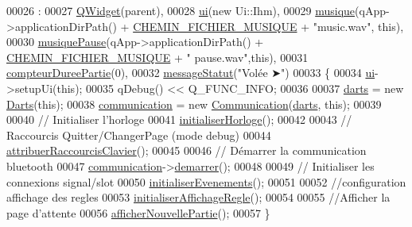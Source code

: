 \begin{DoxyCode}
00026                         :
00027     \hyperlink{class_q_widget}{QWidget}(parent),
00028     \hyperlink{class_ihm_a0ac5f47856566ceeeca1720109bf70ea}{ui}(\textcolor{keyword}{new} Ui::Ihm),
00029     \hyperlink{class_ihm_a6e2a173ec36ee846d6210117b4b85fa8}{musique}(qApp->applicationDirPath() + \hyperlink{ihm_8h_aaf7f17312e64cf24f4c93fc657e5594f}{CHEMIN\_FICHIER\_MUSIQUE} + \textcolor{stringliteral}{"music.wav"},\textcolor{keyword}{
      this}),
00030     \hyperlink{class_ihm_a11e7ae529b6adb7ac98f1aa512172ff2}{musiquePause}(qApp->applicationDirPath() + \hyperlink{ihm_8h_aaf7f17312e64cf24f4c93fc657e5594f}{CHEMIN\_FICHIER\_MUSIQUE} + \textcolor{stringliteral}{"
      pause.wav"},\textcolor{keyword}{this}),
00031     \hyperlink{class_ihm_a61e4a83f8ca0f177971af808e51be5bb}{compteurDureePartie}(0),
00032     \hyperlink{class_ihm_a31a25b36e5560142cb156b8b1a25965f}{messageStatut}(\textcolor{stringliteral}{"Volée ➤"})
00033 \{
00034     \hyperlink{class_ihm_a0ac5f47856566ceeeca1720109bf70ea}{ui}->setupUi(\textcolor{keyword}{this});
00035     qDebug() << Q\_FUNC\_INFO;
00036 
00037     \hyperlink{class_ihm_a2a0f54d33f4d6b2531ec2190c4a2356e}{darts} = \textcolor{keyword}{new} \hyperlink{class_darts}{Darts}(\textcolor{keyword}{this});
00038     \hyperlink{class_ihm_a2f3d4781795781a840786cd8c2233899}{communication} = \textcolor{keyword}{new} \hyperlink{class_communication}{Communication}(\hyperlink{class_ihm_a2a0f54d33f4d6b2531ec2190c4a2356e}{darts}, \textcolor{keyword}{this});
00039 
00040     \textcolor{comment}{// Initialiser l'horloge}
00041     \hyperlink{class_ihm_aa5a3e97de39e919ea8807d30167da510}{initialiserHorloge}();
00042 
00043     \textcolor{comment}{// Raccourcis Quitter/ChangerPage (mode debug)}
00044     \hyperlink{class_ihm_a2b7dbb2d087d4ca15cee9707a1796b62}{attribuerRaccourcisClavier}();
00045 
00046     \textcolor{comment}{// Démarrer la communication bluetooth}
00047     \hyperlink{class_ihm_a2f3d4781795781a840786cd8c2233899}{communication}->\hyperlink{class_communication_af29ea9a1c2ce29436f2331c322f6ebbf}{demarrer}();
00048 
00049     \textcolor{comment}{// Initialiser les connexions signal/slot}
00050     \hyperlink{class_ihm_a9df8990148a898f728304a4e789be2a6}{initialiserEvenements}();
00051 
00052     \textcolor{comment}{//configuration affichage des regles}
00053     \hyperlink{class_ihm_a97b1938c38eef2427b5cf2326feeef3d}{initialiserAffichageRegle}();
00054 
00055     \textcolor{comment}{//Afficher la page d'attente}
00056     \hyperlink{class_ihm_a90c6b5c75d3903f50ea7c00b8093c686}{afficherNouvellePartie}();
00057 \}
\end{DoxyCode}
\mbox{\label{class_ihm_add292ea9005bacd1de44dd1ed9ede5b9}} 
